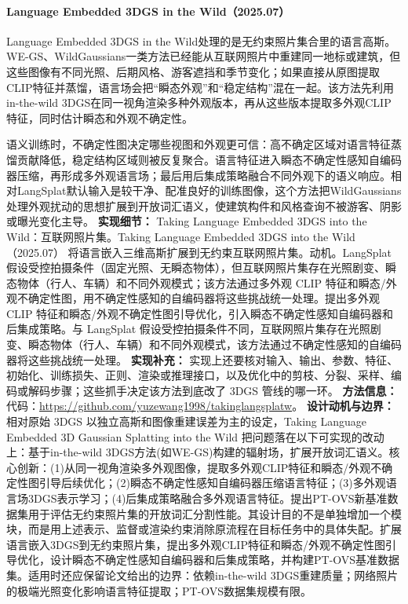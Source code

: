 \paragraph{Language Embedded 3DGS in the Wild（2025.07）\cite{2507_19830}}
Language Embedded 3DGS in the Wild处理的是无约束照片集合里的语言高斯。WE-GS、WildGaussians一类方法已经能从互联网照片中重建同一地标或建筑，但这些图像有不同光照、后期风格、游客遮挡和季节变化；如果直接从原图提取CLIP特征并蒸馏，语言场会把“瞬态外观”和“稳定结构”混在一起。该方法先利用in-the-wild 3DGS在同一视角渲染多种外观版本，再从这些版本提取多外观CLIP特征，同时估计瞬态和外观不确定性。

语义训练时，不确定性图决定哪些视图和外观更可信：高不确定区域对语言特征蒸馏贡献降低，稳定结构区域则被反复聚合。语言特征进入瞬态不确定性感知自编码器压缩，再形成多外观语言场；最后用后集成策略融合不同外观下的语义响应。相对LangSplat默认输入是较干净、配准良好的训练图像，这个方法把WildGaussians处理外观扰动的思想扩展到开放词汇语义，使建筑构件和风格查询不被游客、阴影或曝光变化主导。
\textbf{实现细节：} Taking Language Embedded 3DGS into the Wild：互联网照片集。Taking Language Embedded 3DGS into the Wild（2025.07） 将语言嵌入三维高斯扩展到无约束互联网照片集。动机。LangSplat 假设受控拍摄条件（固定光照、无瞬态物体），但互联网照片集存在光照剧变、瞬态物体（行人、车辆）和不同外观模式；该方法通过多外观 CLIP 特征和瞬态/外观不确定性图，用不确定性感知的自编码器将这些挑战统一处理。提出多外观 CLIP 特征和瞬态/外观不确定性图引导优化，引入瞬态不确定性感知自编码器和后集成策略。与 LangSplat 假设受控拍摄条件不同，互联网照片集存在光照剧变、瞬态物体（行人、车辆）和不同外观模式，该方法通过不确定性感知的自编码器将这些挑战统一处理。
\textbf{实现补充：} 实现上还要核对输入、输出、参数、特征、初始化、训练损失、正则、渲染或推理接口，以及优化中的剪枝、分裂、采样、编码或解码步骤；这些抓手决定该方法到底改了 3DGS 管线的哪一环。
\textbf{方法信息：} 代码：\url{https://github.com/yuzewang1998/takinglangsplatw}。
\textbf{设计动机与边界：} 相对原始 3DGS 以独立高斯和图像重建误差为主的设定，Taking Language Embedded 3D Gaussian Splatting into the Wild 把问题落在以下可实现的改动上：基于in-the-wild 3DGS方法(如WE-GS)构建的辐射场，扩展开放词汇语义。核心创新：(1)从同一视角渲染多外观图像，提取多外观CLIP特征和瞬态/外观不确定性图引导后续优化；(2)瞬态不确定性感知自编码器压缩语言特征；(3)多外观语言场3DGS表示学习；(4)后集成策略融合多外观语言特征。提出PT-OVS新基准数据集用于评估无约束照片集的开放词汇分割性能。其设计目的不是单独增加一个模块，而是用上述表示、监督或渲染约束消除原流程在目标任务中的具体失配。扩展语言嵌入3DGS到无约束照片集，提出多外观CLIP特征和瞬态/外观不确定性图引导优化，设计瞬态不确定性感知自编码器和后集成策略，并构建PT-OVS基准数据集。适用时还应保留论文给出的边界：依赖in-the-wild 3DGS重建质量；网络照片的极端光照变化影响语言特征提取；PT-OVS数据集规模有限。
